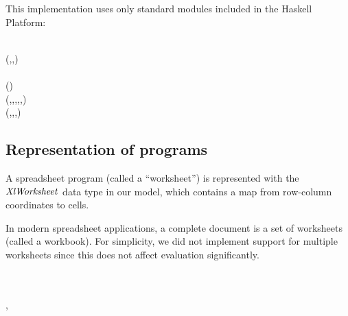 This implementation uses only standard modules included in the Haskell Platform:

\begin{hscode}\SaveRestoreHook
{}%
%
\>[B]{}\;\;\<[E]%
\\[\blanklineskip]%
\>[B]{}\;\;(,,){}\<[E]%
\\
\>[B]{}\;\<[E]%
\\
\>[B]{}\;\;(){}\<[E]%
\\
\>[B]{}\;\;\;\;(,,,,,){}\<[E]%
\\
\>[B]{}\;\;\;\;(,,,){}\<[E]%
\\
\>[B]{}\;\<[E]%
\ColumnHook
\end{hscode}\resethooks

\subsection{Representation of programs}

A spreadsheet program (called a ``worksheet'') is represented with the
\ensuremath{\Conid{XlWorksheet}} data type in our model, which contains a map from row-column
coordinates to cells.

In modern spreadsheet applications, a complete document is a set of worksheets
(called a workbook). For simplicity, we did not implement support for multiple
worksheets since this does not affect evaluation significantly.

\begin{hscode}\SaveRestoreHook
{}%
%
%
\>[B]{}\;\mathrel{=}\;\<[E]%
\\
\>[B]{}\<[4]%
\>[4]{}\;\<[E]%
\\[\blanklineskip]%
\>[B]{}\;\mathrel{=}\;\llparenthesis \cdot , \cdot \rrparenthesis \;\<[E]%
\ColumnHook
\end{hscode}\resethooks

